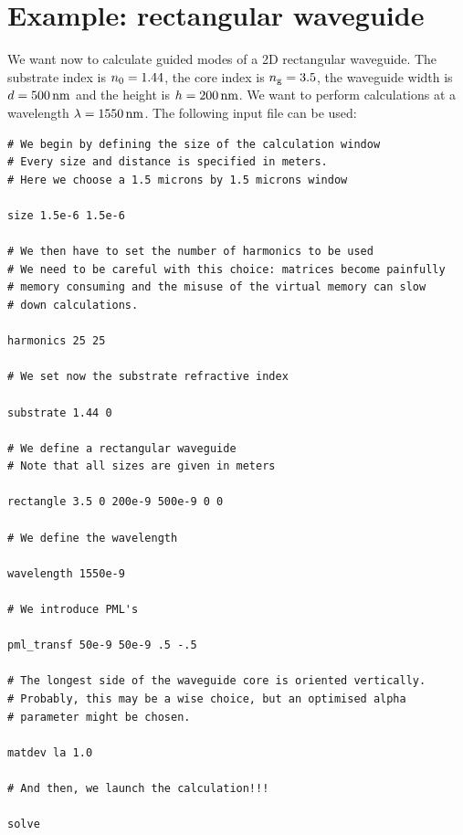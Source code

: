 \section{Example: rectangular waveguide}
We want now to calculate guided modes of a 2D rectangular waveguide. The substrate index is $n_\mathrm{0}=1.44$, the core index is $n_\mathrm{g}=3.5$, the waveguide width is $d=500\,\mathrm{nm}$ and the height is $h=200\,\mathrm{nm}$. We want to perform calculations at a wavelength $\lambda=1550\,\mathrm{nm}$.
The following input file can be used:
\begin{lstlisting}
# We begin by defining the size of the calculation window
# Every size and distance is specified in meters.
# Here we choose a 1.5 microns by 1.5 microns window

size 1.5e-6 1.5e-6

# We then have to set the number of harmonics to be used
# We need to be careful with this choice: matrices become painfully
# memory consuming and the misuse of the virtual memory can slow 
# down calculations.

harmonics 25 25

# We set now the substrate refractive index

substrate 1.44 0

# We define a rectangular waveguide
# Note that all sizes are given in meters

rectangle 3.5 0 200e-9 500e-9 0 0

# We define the wavelength

wavelength 1550e-9

# We introduce PML's

pml_transf 50e-9 50e-9 .5 -.5

# The longest side of the waveguide core is oriented vertically.
# Probably, this may be a wise choice, but an optimised alpha 
# parameter might be chosen.

matdev la 1.0

# And then, we launch the calculation!!!

solve

\end{lstlisting}

